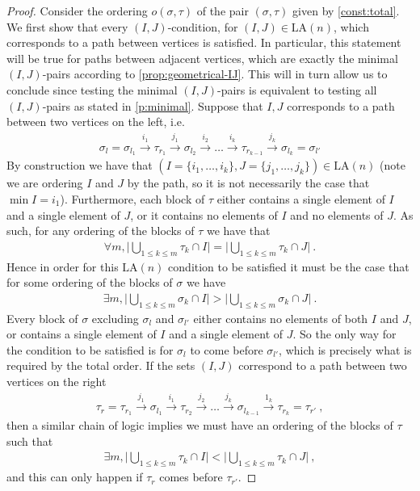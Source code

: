 \documentclass{amsart}
\theoremstyle{definition}
\newcommand{\LA}{\mathrm{LA}}
\begin{document}
\begin{proof}
Consider the ordering $o(\sigma,\tau)$ of the pair $(\sigma,\tau)$ given by \cref{const:total}. 
We first show that every $(I,J)$-condition, for $(I,J) \in \LA(n)$, which corresponds to a path between vertices is satisfied. 
In particular, this statement will be true for paths between adjacent vertices, which are exactly the minimal $(I,J)$-pairs according to \cref{prop:geometrical-IJ}.
This will in turn allow us to conclude since testing the minimal $(I,J)$-pairs is equivalent to testing all $(I,J)$-pairs as stated in \cref{p:minimal}. 
Suppose that $I,J$ corresponds to a path between two vertices on the left, i.e.
\begin{align*}
    \sigma_l = \sigma_{l_1} \xrightarrow{i_1} \tau_{r_1}\xrightarrow{j_1} \sigma_{l_2} \xrightarrow{i_2}\dots \xrightarrow{i_{k}} \tau_{r_{k-1}} \xrightarrow{j_k} \sigma_{l_k}= \sigma_{l'}
\end{align*}
By construction we have that $(I = \{i_1,\dots,i_k\},J=\{j_1,\dots,j_k\}) \in \LA(n)$ (note we are ordering $I$ and $J$ by the path, so it is not necessarily the case that $\min I = i_1$). 
Furthermore, each block of $\tau$ either contains a single element of $I$ and a single element of $J$, or it contains no elements of $I$ and no elements of $J$. 
As such, for any ordering of the blocks of $\tau$ we have that
\begin{align*}
    \forall m, \bigg|\bigcup_{1\leq k \leq m} \tau_{k} \cap I \bigg| = \bigg|\bigcup_{1\leq k \leq m} \tau_{k} \cap J \bigg| \ .
\end{align*}
Hence in order for this $\LA(n)$ condition to be satisfied it must be the case that for some ordering of the blocks of $\sigma$ we have
\begin{align*}
    \exists m, \bigg| \bigcup_{1\leq k \leq m} \sigma_k \cap I \bigg| > \bigg|\bigcup_{1\leq k \leq m} \sigma_k \cap J \bigg| \ .
\end{align*}
Every block of $\sigma$ excluding $\sigma_l$ and $\sigma_{l'}$ either contains no elements of both $I$ and $J$, or contains a single element of $I$ and a single element of $J$. 
So the only way for the condition to be satisfied is for $\sigma_l$ to come before $\sigma_{l'}$, which is precisely what is required by the total order.
If the sets $(I,J)$ correspond to a path between two vertices on the right
\begin{align*}
    \tau_r = \tau_{r_1} \xrightarrow{j_1} \sigma_{l_1}\xrightarrow{i_1} \tau_{r_2} \xrightarrow{j_2}\dots \xrightarrow{j_{k}} \sigma_{l_{k-1}} \xrightarrow{1_k} \tau_{r_k}=\tau_{r'} \ ,
\end{align*}
then a similar chain of logic implies we must have an ordering of the blocks of $\tau$ such that
\begin{align*}
    \exists m, \bigg|\bigcup_{1\leq k \leq m}\tau_k \cap I\bigg| < \bigg|\bigcup_{1\leq k \leq m} \tau_k \cap J\bigg| \ , 
\end{align*}
and this can only happen if $\tau_r$ comes before $\tau_{r'}$.
\end{proof}
\end{document}
